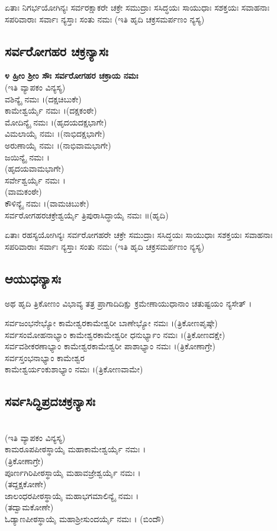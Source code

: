  ಏತಾಃ ನಿಗರ್ಭಯೋಗಿನ್ಯಃ ಸರ್ವರಕ್ಷಾಕರೇ ಚಕ್ರೇ ಸಮುದ್ರಾಃ ಸಸಿದ್ಧಯಃ ಸಾಯುಧಾಃ ಸಶಕ್ತಯಃ ಸವಾಹನಾಃ ಸಪರಿವಾರಾಃ ಸರ್ವಾಃ ನ್ಯಸ್ತಾಃ ಸಂತು ನಮಃ (ಇತಿ ಹೃದಿ ಚಕ್ರಸಮರ್ಪಣಂ ನ್ಯಸ್ಯ)
\subsection{ಸರ್ವರೋಗಹರ ಚಕ್ರನ್ಯಾಸಃ}
{\bfseries ೪ ಹ್ರೀಂ ಶ್ರೀಂ ಸೌಃ ಸರ್ವರೋಗಹರ ಚಕ್ರಾಯ ನಮಃ}\\(ಇತಿ ವ್ಯಾಪಕಂ ವಿನ್ಯಸ್ಯ)\\
 ವಶಿನ್ಯೈ ನಮಃ ।(ದಕ್ಷಚಿಬುಕೇ)\\
 ಕಾಮೇಶ್ವರ್ಯೈ ನಮಃ ।(ದಕ್ಷಕಂಠೇ)\\
 ಮೋದಿನ್ಯೈ ನಮಃ ।(ಹೃದಯದಕ್ಷಭಾಗೇ)\\
 ವಿಮಲಾಯೈ ನಮಃ ।(ನಾಭಿದಕ್ಷಭಾಗೇ)\\
 ಅರುಣಾಯೈ ನಮಃ ।(ನಾಭಿವಾಮಭಾಗೇ)\\
 ಜಯಿನ್ಯೈ ನಮಃ ।\\(ಹೃದಯವಾಮಭಾಗೇ)\\
 ಸರ್ವೇಶ್ವರ್ಯೈ ನಮಃ ।\\(ವಾಮಕಂಠೇ)\\
 ಕೌಳಿನ್ಯೈ ನಮಃ ।(ವಾಮಚಿಬುಕೇ)\\
 ಸರ್ವರೋಗಹರಚಕ್ರೇಶ್ವರ್ಯೈ ತ್ರಿಪುರಾಸಿದ್ಧಾಯೈ ನಮಃ ॥(ಹೃದಿ)

 ಏತಾಃ ರಹಸ್ಯಯೋಗಿನ್ಯಃ ಸರ್ವರೋಗಹರೇ ಚಕ್ರೇ ಸಮುದ್ರಾಃ ಸಸಿದ್ಧಯಃ ಸಾಯುಧಾಃ ಸಶಕ್ತಯಃ ಸವಾಹನಾಃ ಸಪರಿವಾರಾಃ ಸರ್ವಾಃ ನ್ಯಸ್ತಾಃ ಸಂತು ನಮಃ (ಇತಿ ಹೃದಿ ಚಕ್ರಸಮರ್ಪಣಂ ನ್ಯಸ್ಯ)
\subsection{ಆಯುಧನ್ಯಾಸಃ}
ಅಥ ಹೃದಿ ತ್ರಿಕೋಣಂ ವಿಭಾವ್ಯ ತತ್ರ ಪ್ರಾಗಾದಿದಿಕ್ಷು ಕ್ರಮೇಣಾಯುಧಾನಾಂ ಚತುಷ್ಟಯಂ ನ್ಯಸೇತ್ ।

 ಸರ್ವಜಂಭನೇಭ್ಯೋ ಕಾಮೇಶ್ವರಕಾಮೇಶ್ವರೀ ಬಾಣೇಭ್ಯೋ ನಮಃ ।(ತ್ರಿಕೋಣಪೃಷ್ಠೇ)\\
 ಸರ್ವಸಂಮೋಹನಾಭ್ಯಾಂ ಕಾಮೇಶ್ವರಕಾಮೇಶ್ವರೀ ಧನುರ್ಭ್ಯಾಂ ನಮಃ ।(ತ್ರಿಕೋಣದಕ್ಷೇ)\\
 ಸರ್ವವಶೀಕರಣಾಭ್ಯಾಂ ಕಾಮೇಶ್ವರಕಾಮೇಶ್ವರೀ ಪಾಶಾಭ್ಯಾಂ ನಮಃ ।(ತ್ರಿಕೋಣಾಗ್ರೇ)\\
 ಸರ್ವಸ್ತಂಭನಾಭ್ಯಾಂ ಕಾಮೇಶ್ವರ \\ಕಾಮೇಶ್ವರ್ಯಂಕುಶಾಭ್ಯಾಂ  ನಮಃ ।(ತ್ರಿಕೋಣವಾಮೇ)
\subsection{ಸರ್ವಸಿದ್ಧಿಪ್ರದಚಕ್ರನ್ಯಾಸಃ}
\\(ಇತಿ ವ್ಯಾಪಕಂ ವಿನ್ಯಸ್ಯ)\\
 ಕಾಮರೂಪಪೀಠಸ್ಥಾಯೈ ಮಹಾಕಾಮೇಶ್ವರ್ಯೈ ನಮಃ ।\\(ತ್ರಿಕೋಣಾಗ್ರೇ)\\
 ಪೂರ್ಣಗಿರಿಪೀಠಸ್ಥಾಯೈ ಮಹಾವಜ್ರೇಶ್ವರ್ಯೈ ನಮಃ ।\\(ತದ್ದಕ್ಷಕೋಣೇ)\\
 ಜಾಲಂಧರಪೀಠಸ್ಥಾಯೈ ಮಹಾಭಗಮಾಲಿನ್ಯೈ ನಮಃ ।\\(ತದ್ವಾಮಕೋಣೇ)\\
 ಓಡ್ಯಾಣಪೀಠಸ್ಥಾಯೈ ಮಹಾಶ್ರೀಸುಂದರ್ಯೈ ನಮಃ । (ಬಿಂದೌ)


